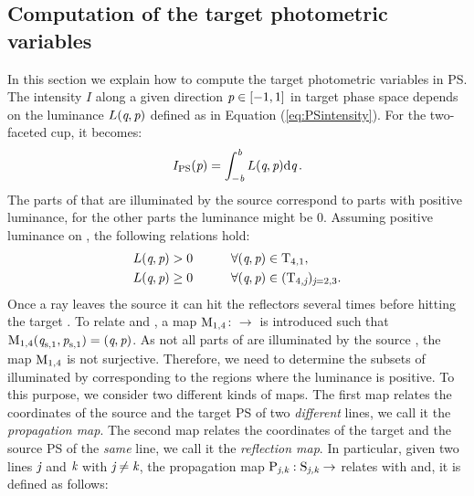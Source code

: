 \subsection{Computation of the target photometric variables}
In this section we explain how to compute the target photometric variables in PS.
The intensity $I$ along a given direction $\textit{p}\in [-1,1]$ in target phase space  depends on the luminance $L(\textit{q}, \textit{p})$ defined as in Equation (\ref{eq:PSintensity}). For the two-faceted cup, it becomes:
\begin{equation}\label{I(eta)}
I_{\textrm{PS}}(\textit{p}) = \int_{-\textit{b}}^{\textit{b}} L(\textit{q},\textit{p}) \textrm{d}\textit{q}\,.
\end{equation}
The parts of  that are illuminated by the source  correspond to parts with positive luminance, for the other parts the luminance might be $0$.
Assuming positive luminance on , the following relations hold:
\begin{equation}\label{LT4}
\begin{aligned}
L(\textit{q}, \textit{p})&>0 \qquad \quad \forall (\textit{q}, \textit{p})\in \mbox{$\textup{T}_{\textit{$4$,$1$}}$},\\
L(\textit{q}, \textit{p})&\geq 0 \qquad\quad \forall(\textit{q}, \textit{p}) \in (\mbox{$\textup{T}_{\textit{$4$,\textit{j}}}$})_{\textit{j}=2,3}.
\end{aligned}
\end{equation}
Once a ray leaves the source  it can hit the reflectors several times before hitting the target . To relate  and , a map $\mathrm{M}_{1,4}$: $\rightarrow$  is introduced such that $\mathrm{M}_{1,4}(\textit{q}_{\textrm{s,} \textit{$1$}},\textit{p}_{\textrm{s,} \textit{$1$}})=(\textit{q},\textit{p})$. As  not all parts of  are illuminated by the source , the map
$\mathrm{M}_{1,4}$ is not surjective.
Therefore, we need to determine the subsets of  illuminated by  corresponding to the regions where the luminance is positive.
To this purpose, we consider two different kinds of maps.
The first map relates the coordinates of the source and the target PS of two \textit{different} lines, we call it the \textit{propagation map}.
The second map relates the coordinates of the target and the source PS of the \textit{same} line, we call it the \textit{reflection map}.
In particular, given two lines $\textit{j}$ and $\textit{k}$ with $\textit{j}\neq\textit{k}$, the propagation map $\mathrm{P}_{\textit{j},\textit{k}}: \mbox{$\textup{S}_{\textit{\textit{j},\textit{k}}}$}\rightarrow$ relates  with  and, it is defined as follows:
